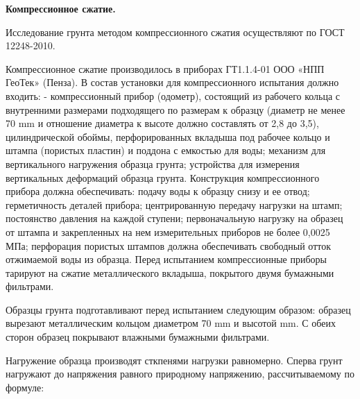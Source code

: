 \textbf{Компрессионное сжатие.}

Исследование грунта методом компрессионного сжатия осуществляют по ГОСТ 12248-2010.


Компрессионное сжатие производилось в приборах ГТ1.1.4-01 ООО «НПП ГеоТек» (Пенза).
В состав установки для компрессионного испытания должно входить: 
- компрессионный прибор (одометр), состоящий из рабочего кольца с
внутренними размерами подходящего по размерам к образцу (диаметр не менее 70 \si{\milli\meter} 
и отношение диаметра к высоте должно составлять от 2,8 до 3,5), цилиндрической обоймы,
перфорированных вкладыша под рабочее кольцо и штампа (пористых
пластин) и поддона с емкостью для воды; механизм для вертикального нагружения образца грунта; 
устройства для измерения вертикальных деформаций образца грунта.
Конструкция компрессионного прибора должна обеспечивать: подачу воды к образцу снизу и ее отвод; 
герметичность деталей прибора; центрированную передачу нагрузки на штамп; постоянство давления 
на каждой ступени; первоначальную нагрузку на образец от штампа и закрепленных на нем
измерительных приборов не более 0,0025 МПа; перфорация пористых штампов должна 
обеспечивать свободный отток отжимаемой воды из образца.
Перед испытанием компрессионные приборы тарируют на сжатие металлического 
вкладыша, покрытого двумя бумажными фильтрами.

Образцы грунта подготавливают перед испытанием следующим образом:
образец вырезают металлическим кольцом диаметром 70 \si{\milli\meter} 
и высотой \si{\milli\meter}. С обеих сторон образец покрывают 
влажными бумажными фильтрами. 

Нагружение образца производят сткпенями нагрузки равномерно. 
Сперва грунт нагружают до напряжения равного природному 
напряжению, рассчитываемому по формуле: 


